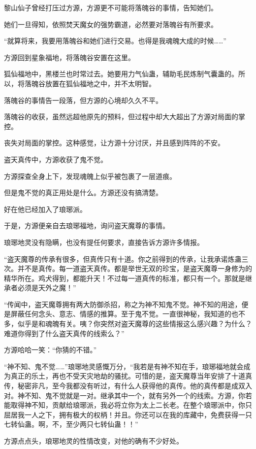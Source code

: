 \begin{this_body}
黎山仙子曾经打压过方源，方源更不可能将落魄谷的事情，告知她们。

她们一旦得知，依照焚天魔女的强势霸道，必然要对落魄谷有所要求。

“就算将来，我要用落魄谷和她们进行交易。也得是我魂魄大成的时候……”

方源回到星象福地，将落魄谷安置在这里。

狐仙福地中，黑楼兰也时常过去。她要用力气仙蛊，辅助毛民炼制气囊蛊的。所以，将落魄谷放置在狐仙福地之中，并不太明智。

落魄谷的事情告一段落，但方源的心境却久久不平。

落魄谷的收获，虽然远超他原先的预料，但过程中却大大超出了方源对局面的掌控。

丧失对局面的掌控。这种感觉，让方源十分讨厌，并且感到阵阵的不安。

盗天真传中，方源收获了鬼不觉。

方源探查全身上下，发现魂魄上似乎被包裹了一层道痕。

但是鬼不觉的真正用处是什么。方源还没有搞清楚。

好在他已经加入了琅琊派。

于是，方源便亲自去琅琊福地，询问盗天魔尊的事情。

琅琊地灵没有隐瞒，也没有提任何要求，直接告诉方源许多情报。

“盗天魔尊的传承有很多，但真传只有十道。你之前得到的传承，让我承诺炼蛊三次。并不是真传。每一道盗天真传。都是举世无双的珍宝，是盗天魔尊一身修为的精华所在。鸡犬得到，都能升天！不过每一道真传的标准，都只有一个。那就是继承者必须是天外之魔！”

“传闻中，盗天魔尊拥有两大防御杀招，称之为神不知鬼不觉。神不知的用途，便是屏蔽任何念头、意志、情感的推算。至于鬼不觉。一直很神秘，我知道的也不多，似乎是和魂魄有关。咦？你突然对盗天魔尊的这些情报这么感兴趣？为什么？难道你得到了什么盗天真传的线索么？”

方源哈哈一笑：“你猜的不错。”

“神不知、鬼不觉……”琅琊地灵感慨万分，“我若是有神不知在手，琅琊福地就会成为真正的乐土，再也不受天灾地劫的骚扰。可惜的是，盗天魔尊当年安排了十道真传，秘密非凡，至今我都没有听过，有什么人获得他的真传。他的真传都是成双入对。神不知、鬼不觉就是一对。继承其中一个，就有另外一个的线索。方源，你若能取得神不知，贡献给琅琊派，我必将立你为太上二长老。在整个琅琊派中，你只屈居我一人之下，拥有极大的权柄！并且。你还可以在我的库藏中，免费获得一只七转仙蛊。啊，不，至少两只七转仙蛊！！”

方源点点头，琅琊地灵的性情改变，对他的确有不少好处。


\end{this_body}
